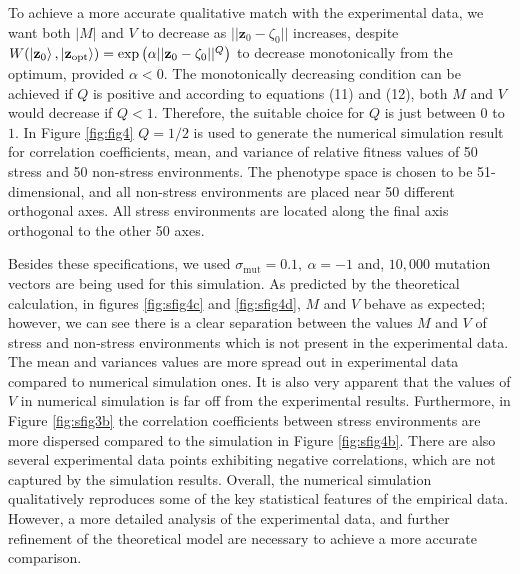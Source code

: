 \documentclass[11pt]{article}
\begin{document}
To achieve a more accurate qualitative match with the experimental data, we want both $|M|$ and $V$ to decrease as $||\mathbf{z}_0 - \zeta_0||$ increases, despite ${W}(\ket{\mathbf{z}_0},\ket{\mathbf{z}_{\mathrm{opt}}}) = \exp\left(\alpha||\mathbf{z}_0 - \zeta_0||^Q\right)$ to decrease monotonically from the optimum, provided $\alpha <0$. The monotonically decreasing condition can be achieved if $Q$ is positive and according to equations (11) and (12), both $M$ and $V$ would decrease if $Q<1$. Therefore, the suitable choice for $Q$ is just between $0$ to $1$. In Figure \ref{fig:fig4} $Q=1/2$ is used to generate the numerical simulation result for correlation coefficients, mean, and variance of relative fitness values of 50 stress and 50 non-stress environments. The phenotype space is chosen to be 51-dimensional, and all non-stress environments are placed near 50 different orthogonal axes. All stress environments are located along the final axis orthogonal to the other 50 axes. 

Besides these specifications, we used $\sigma_{\mathrm{mut}} = 0.1, \ \alpha = -1$ and, $10,000$ mutation vectors are being used for this simulation. As predicted by the theoretical calculation, in figures \ref{fig:sfig4c} and \ref{fig:sfig4d}, $M$ and $V$ behave as expected; however, we can see there is a clear separation between the values $M$ and $V$ of stress and non-stress environments which is not present in the experimental data. The mean and variances values are more spread out in experimental data compared to numerical simulation ones. It is also very apparent that the values of $V$ in numerical simulation is far off from the experimental results. Furthermore, in Figure \ref{fig:sfig3b} the correlation coefficients between stress environments are more dispersed compared to the simulation in Figure \ref{fig:sfig4b}. There are also several experimental data points exhibiting negative correlations, which are not captured by the simulation results. Overall, the numerical simulation qualitatively reproduces some of the key statistical features of the empirical data. However, a more detailed analysis of the experimental data, and further refinement of the theoretical model are necessary to achieve a more accurate comparison.
\end{document}
